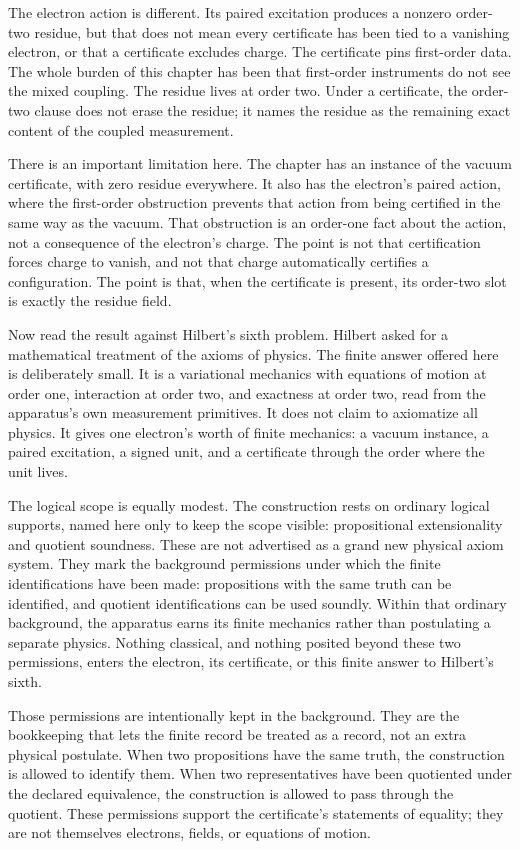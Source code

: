 The electron action is different. Its paired excitation produces a nonzero
order-two residue, but that does not mean every certificate has been tied to a
vanishing electron, or that a certificate excludes charge. The certificate pins
first-order data. The whole burden of this chapter has been that first-order
instruments do not see the mixed coupling. The residue lives at order two.
Under a certificate, the order-two clause does not erase the residue; it names
the residue as the remaining exact content of the coupled measurement.

There is an important limitation here. The chapter has an instance of the
vacuum certificate, with zero residue everywhere. It also has the electron's
paired action, where the first-order obstruction prevents that action from
being certified in the same way as the vacuum. That obstruction is an
order-one fact about the action, not a consequence of the electron's charge.
The point is not that certification forces charge to vanish, and not that
charge automatically certifies a configuration. The point is that, when the
certificate is present, its order-two slot is exactly the residue field.

Now read the result against Hilbert's sixth problem. Hilbert asked for a
mathematical treatment of the axioms of physics. The finite answer offered here
is deliberately small. It is a variational mechanics with equations of motion
at order one, interaction at order two, and exactness at order two, read
from the apparatus's own measurement primitives. It does not claim to axiomatize
all physics. It gives one electron's worth of finite mechanics: a vacuum
instance, a paired excitation, a signed unit, and a certificate through the
order where the unit lives.

The logical scope is equally modest. The construction rests on ordinary logical
supports, named here only to keep the scope visible: propositional
extensionality and quotient soundness. These are not advertised as a grand new
physical axiom system. They mark the background permissions under which the
finite identifications have been made: propositions with the same truth can be
identified, and quotient identifications can be used soundly. Within that
ordinary background, the apparatus earns its finite mechanics rather than
postulating a separate physics. Nothing classical, and nothing posited beyond
these two permissions, enters the electron, its certificate, or this finite
answer to Hilbert's sixth.

Those permissions are intentionally kept in the background. They are the
bookkeeping that lets the finite record be treated as a record, not an extra
physical postulate. When two propositions have the same truth, the construction
is allowed to identify them. When two representatives have been quotiented
under the declared equivalence, the construction is allowed to pass through the
quotient. These permissions support the certificate's statements of equality;
they are not themselves electrons, fields, or equations of motion.

